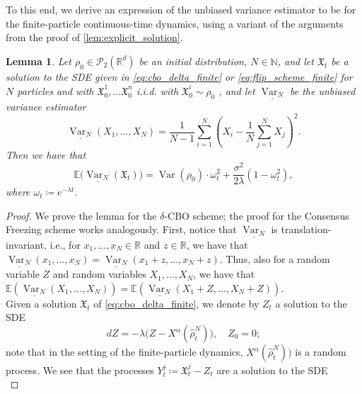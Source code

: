 \documentclass[reqno]{amsart}
\numberwithin{algorithm}{section}
\newcommand{\R}{\mathbb{R}}
\newcommand{\EE}{{\mathbb E}}
\newcommand{\Xalpha}{{X^\alpha}}
\newcommand{\Xf}{{\mathfrak{X}}}
\newcommand{\NN}{{\mathbb N}}
\newtheorem{lemma}[theorem]{Lemma}
\begin{document}
{To this end, we derive an expression of the unbiased variance estimator to be for the finite-particle continuous-time dynamics, using a variant of the arguments from the proof of \cref{lem:explicit_solution}.
\begin{lemma}
    Let $\rho_0 \in \mathcal{P}_2(\R^d)$ be an initial distribution, $N \in \NN$, and let $\Xf_t$ be a solution to the SDE given in \cref{eq:cbo_delta_finite} or \cref{eq:flip_scheme_finite} for $N$ particles and with $\Xf_0^1, \dots \Xf_0^n$ i.i.d. with $\Xf_0^i\sim\rho_0$ , and let $\underline{\operatorname{Var}_N}$ be the unbiased variance estimator
    \begin{equation*}
        \underline{\operatorname{Var}_N}(X_1, \dots, X_N) = \frac{1}{N-1} \sum_{i=1}^{N} \left(X_i - \frac{1}{N}\sum_{j=1}^{N}X_j\right)^2.
    \end{equation*}
    Then we have that
    \begin{equation*}
        \EE\big(\underline{\operatorname{Var}_N}(\Xf_t)\big) = \operatorname{Var}(\rho_0) \cdot \omega_t^2 + \frac{\sigma^2}{2\lambda} (1 - \omega_t^2),
    \end{equation*}
    where $\omega_t \coloneqq e^{-\lambda t}$.
\end{lemma}
\begin{proof}
    We prove the lemma for the $\delta$-CBO scheme; the proof for the Consensus Freezing scheme works analogously. First, notice that $\underline{\operatorname{Var}_N}$ is translation-invariant, i.e., for $x_1, \dots, x_N \in \R$ and $z \in \R$, we have that $\underline{\operatorname{Var}_N}(x_1, \dots, x_N) = \underline{\operatorname{Var}_N}(x_1 + z, \dots, x_N + z)$. Thus, also for a random variable $Z$ and random variables $X_1, \dots, X_N$, we have that $\EE(\underline{\operatorname{Var}_N}(X_1, \dots, X_N)) = \EE(\underline{\operatorname{Var}_N}(X_1 + Z, \dots, X_N + Z)).$\\
    Given a solution $\Xf_t$ of \cref{eq:cbo_delta_finite}, we denote by $Z_t$ a solution to the SDE
    \begin{equation*}
        dZ = -\lambda \big(Z - \Xalpha(\widehat\rho^N_t)\big),\quad  Z_0 = 0;
    \end{equation*}
    note that in the setting of the finite-particle dynamics, $\Xalpha(\widehat\rho^N_t)\big)$ is a random process. We see that the processes $Y^j_t \coloneqq \Xf^j_t - Z_t$ are a solution to the SDE
    \begin{equation}\label{eq:experiments_proof_eq}

\end{equation}
\end{proof}}
\end{document}
